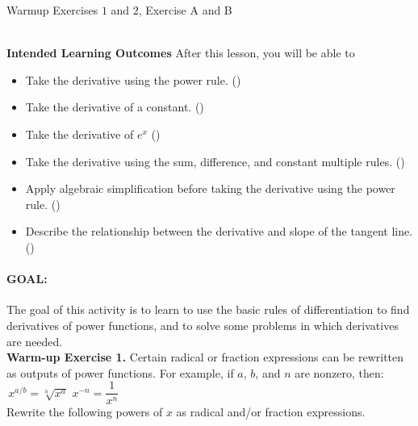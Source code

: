 \documentclass[10pt]{article}
\begin{document}
\core Warmup Exercises $1$ and $2$, Exercise A and B



\newpage
\hrulefill\\

\textbf{Intended Learning Outcomes}
After this lesson, you will be able to 

\begin{itemize}
    \item Take the derivative using the power rule. ()
    \item Take the derivative of a constant. ()
    \item Take the derivative of $e^x$ ()
    \item Take the derivative using the sum, difference, and constant multiple rules. ()
    \item Apply algebraic simplification before taking the derivative using the power rule. ()
    \item Describe the relationship between the derivative and slope of the tangent line.()
\end{itemize}

\vspace{-0.5cm}

\hrulefill

\paragraph*{GOAL:} The goal of this activity is to learn to use the basic rules of differentiation to find derivatives of power functions, and to solve some problems in which derivatives are needed.\\

{\bf\color{blue} Warm-up Exercise 1.} Certain radical or fraction expressions can be rewritten as outputs of power functions. For example, if $a$, $b$, and $n$ are nonzero, then:\\

\,\hfill $x^{a/b} = \sqrt[b]{x^a}$ \hfill $x^{-n} = \dfrac{1}{x^n}$ \hfill\,\\

Rewrite the following powers of $x$ as radical and/or fraction expressions.
\end{document}
